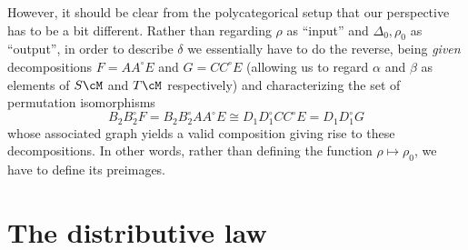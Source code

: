 \documentclass{amsart}
\renewcommand{\o}{^{\circ}}
\begin{document}
However, it should be clear from the polycategorical setup that our perspective has to be a bit different.
Rather than regarding $\rho$ as ``input'' and $\Delta_0,\rho_0$ as ``output'', in order to describe $\delta$ we essentially have to do the reverse, being \emph{given} decompositions $F = A A\o E$ and $G = C C\o E$ (allowing us to regard $\alpha$ and $\beta$ as elements of $S\cM$ and $T\cM$ respectively) and characterizing the set of permutation isomorphisms
\[B_2 B_2\o F = B_2 B_2\o A A\o E \cong D_1 D_1\o C C\o E = D_1 D_1\o G \]
whose associated graph yields a valid composition giving rise to these decompositions.
In other words, rather than defining the function $\rho \mapsto \rho_0$, we have to define its preimages.



\section{The distributive law}
\label{sec:dl}

\end{document}
